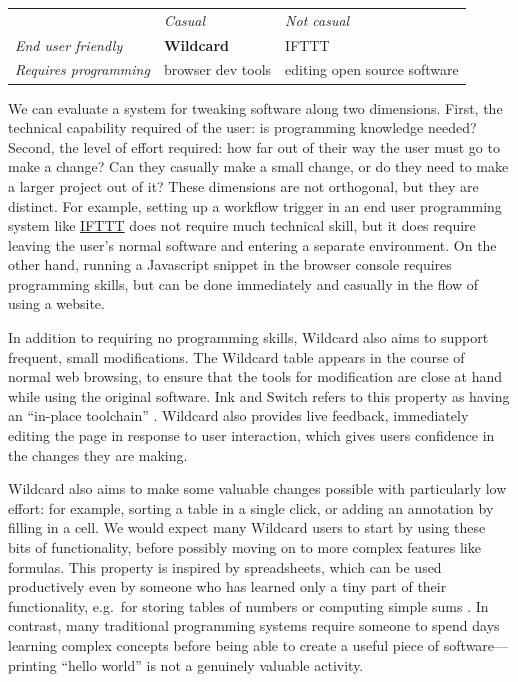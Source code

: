 \documentclass[english,submission]{programming}
\begin{document}
\begin{longtable}[]{@{}lll@{}}
\toprule
\endhead
& \emph{Casual} & \emph{Not casual}\tabularnewline
\emph{End user friendly} & \textbf{Wildcard} & IFTTT\tabularnewline
\emph{Requires programming} & browser dev tools & editing open source
software\tabularnewline
\bottomrule
\end{longtable}

We can evaluate a system for tweaking software along two dimensions.
First, the technical capability required of the user: is programming
knowledge needed? Second, the level of effort required: how far out of
their way the user must go to make a change? Can they casually make a
small change, or do they need to make a larger project out of it? These
dimensions are not orthogonal, but they are distinct. For example,
setting up a workflow trigger in an end user programming system like
\href{https://ifttt.com/}{IFTTT} does not require much technical skill,
but it does require leaving the user's normal software and entering a
separate environment. On the other hand, running a Javascript snippet in
the browser console requires programming skills, but can be done
immediately and casually in the flow of using a website.

In addition to requiring no programming skills, Wildcard also aims to
support frequent, small modifications. The Wildcard table appears in the
course of normal web browsing, to ensure that the tools for modification
are close at hand while using the original software. Ink and Switch
refers to this property as having an ``in-place toolchain''
\autocite{inkandswitch2019}. Wildcard also provides live feedback,
immediately editing the page in response to user interaction, which
gives users confidence in the changes they are making.

Wildcard also aims to make some valuable changes possible with
particularly low effort: for example, sorting a table in a single click,
or adding an annotation by filling in a cell. We would expect many
Wildcard users to start by using these bits of functionality, before
possibly moving on to more complex features like formulas. This property
is inspired by spreadsheets, which can be used productively even by
someone who has learned only a tiny part of their functionality,
e.g.~for storing tables of numbers or computing simple sums
\autocite{nardi1991}. In contrast, many traditional programming systems
require someone to spend days learning complex concepts before being
able to create a useful piece of software---printing ``hello world'' is
not a genuinely valuable activity.
\end{document}
